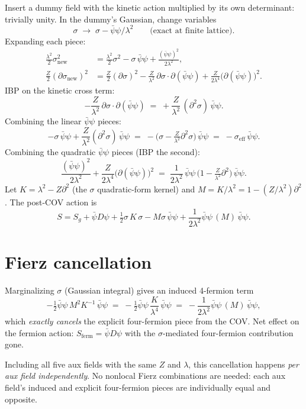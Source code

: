 \documentclass[11pt]{article}
\begin{document}
Insert a dummy field with the kinetic action multiplied by its own determinant: trivially unity.  In the dummy's Gaussian, change variables
\[
\sigma \;\to\; \sigma - \bar\psi\psi / \lambda^2
\qquad\text{(exact at finite lattice).}
\]
Expanding each piece:
\begin{align*}
\tfrac{\lambda^2}{2}\sigma_{\text{new}}^2 &= \tfrac{\lambda^2}{2}\sigma^2 - \sigma\,\bar\psi\psi + \frac{(\bar\psi\psi)^2}{2\lambda^2}, \\
\tfrac{Z}{2}(\partial\sigma_{\text{new}})^2 &= \tfrac{Z}{2}(\partial\sigma)^2 - \frac{Z}{\lambda^2}\,\partial\sigma\cdot\partial(\bar\psi\psi) + \frac{Z}{2\lambda^4}\big(\partial(\bar\psi\psi)\big)^2.
\end{align*}
IBP on the kinetic cross term:
\[
-\frac{Z}{\lambda^2}\,\partial\sigma\cdot\partial(\bar\psi\psi) \;=\; +\frac{Z}{\lambda^2}\,(\partial^2\sigma)\,\bar\psi\psi.
\]
Combining the linear $\bar\psi\psi$ pieces:
\[
-\sigma\,\bar\psi\psi + \frac{Z}{\lambda^2}(\partial^2\sigma)\,\bar\psi\psi
\;=\; -\Big(\sigma - \tfrac{Z}{\lambda^2}\partial^2\sigma\Big)\,\bar\psi\psi
\;=\; -\sigma_{\text{eff}}\,\bar\psi\psi.
\]
Combining the quadratic $\bar\psi\psi$ pieces (IBP the second):
\[
\frac{(\bar\psi\psi)^2}{2\lambda^2} + \frac{Z}{2\lambda^4}\big(\partial(\bar\psi\psi)\big)^2
\;=\; \frac{1}{2\lambda^2}\,\bar\psi\psi\,\Big(1 - \tfrac{Z}{\lambda^2}\partial^2\Big)\,\bar\psi\psi.
\]
Let $K = \lambda^2 - Z\partial^2$ (the $\sigma$ quadratic-form kernel) and $M = K/\lambda^2 = 1 - (Z/\lambda^2)\partial^2$.  The post-COV action is
\[
S = S_g + \bar\psi D \psi + \tfrac{1}{2}\sigma\,K\,\sigma - M\sigma\,\bar\psi\psi
+ \frac{1}{2\lambda^2}\bar\psi\psi\,(M)\,\bar\psi\psi.
\]

\section*{Fierz cancellation}

Marginalizing $\sigma$ (Gaussian integral) gives an induced 4-fermion term
\[
-\tfrac{1}{2}\bar\psi\psi\,M^2 K^{-1}\,\bar\psi\psi
\;=\; -\tfrac{1}{2}\bar\psi\psi\,\frac{K}{\lambda^4}\,\bar\psi\psi
\;=\; -\frac{1}{2\lambda^2}\bar\psi\psi\,(M)\,\bar\psi\psi,
\]
which \emph{exactly cancels} the explicit four-fermion piece from the COV.  Net effect on the fermion action: $S_{\text{ferm}} = \bar\psi D \psi$ with the $\sigma$-mediated four-fermion contribution gone.

Including all five aux fields with the same $Z$ and $\lambda$, this cancellation happens \emph{per aux field independently}.  No nonlocal Fierz combinations are needed: each aux field's induced and explicit four-fermion pieces are individually equal and opposite.
\end{document}
